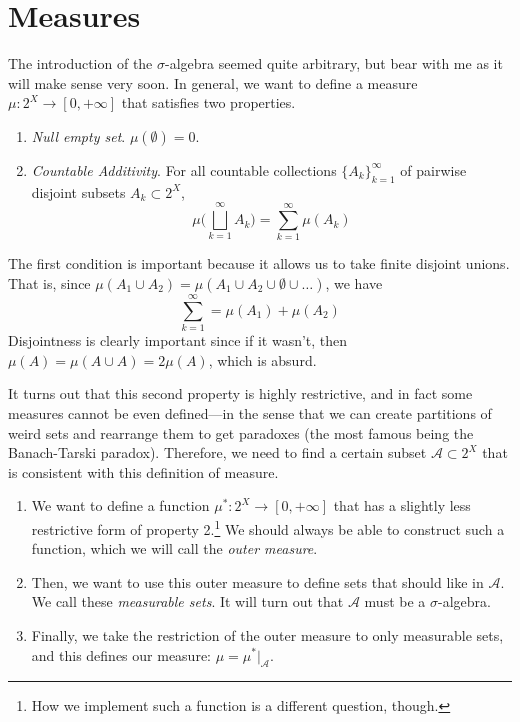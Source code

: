 \section{Measures}  

  The introduction of the $\sigma$-algebra seemed quite arbitrary, but bear with me as it will make sense very soon. In general, we want to define a measure $\mu: 2^X \to [0, +\infty]$ that satisfies two properties. 
  \begin{enumerate}
    \item \textit{Null empty set}. $\mu(\emptyset) = 0$. 
    \item \textit{Countable Additivity}. For all countable collections $\{A_k\}_{k=1}^\infty$ of pairwise disjoint subsets $A_k \subset 2^{X}$, 
    \begin{equation}
      \mu \bigg( \bigsqcup_{k=1}^\infty A_k \bigg) = \sum_{k=1}^\infty \mu(A_k)
    \end{equation}
  \end{enumerate} 

  The first condition is important because it allows us to take finite disjoint unions. That is, since $\mu(A_1 \cup A_2) = \mu(A_1 \cup A_2 \cup \emptyset \cup \ldots)$, we have 
  \begin{equation}
    \sum_{k=1}^\infty = \mu(A_1) + \mu(A_2)
  \end{equation}
  Disjointness is clearly important since if it wasn't, then $\mu(A) = \mu(A \cup A) = 2 \mu(A)$, which is absurd. 

  It turns out that this second property is highly restrictive, and in fact some measures cannot be even defined---in the sense that we can create partitions of weird sets and rearrange them to get paradoxes (the most famous being the Banach-Tarski paradox). Therefore, we need to find a certain subset $\mathcal{A} \subset 2^X$ that is consistent with this definition of measure. 
  
  \begin{enumerate}
    \item We want to define a function $\mu^\ast: 2^X \to [0, +\infty]$ that has a slightly less restrictive form of property 2.\footnote{How we implement such a function is a different question, though.} We should always be able to construct such a function, which we will call the \textit{outer measure}. 

    \item Then, we want to use this outer measure to define sets that should like in $\mathcal{A}$. We call these \textit{measurable sets}. It will turn out that $\mathcal{A}$ must be a $\sigma$-algebra. 

    \item Finally, we take the restriction of the outer measure to only measurable sets, and this defines our measure: $\mu = \mu^\ast \big|_{\mathcal{A}}$.  
  \end{enumerate}

